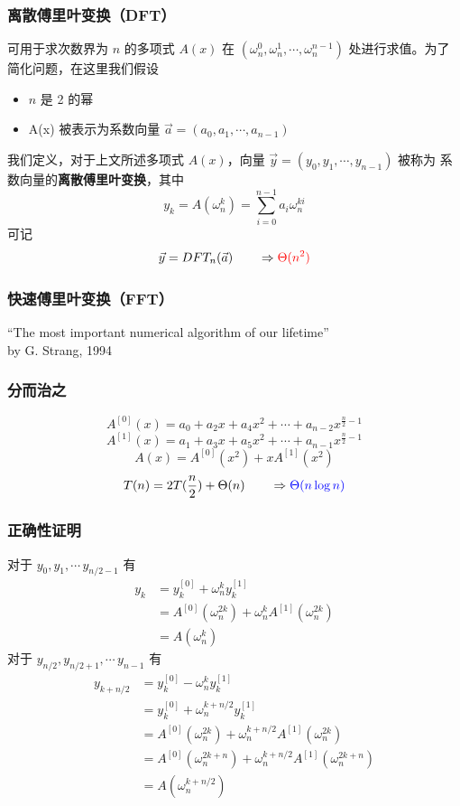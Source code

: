 \documentclass[UTF8]{ctexbeamer}
\begin{document}
\begin{frame}
    \frametitle{离散傅里叶变换（DFT）}
    可用于求次数界为 $n$ 的多项式 $A(x)$ 在
    $(\omega_n^{0}, \omega_n^{1}, \cdots, \omega_n^{n - 1})$
    处进行求值。为了简化问题，在这里我们假设
    \begin{itemize}
        \item $n$ 是 2 的幂
        \item A(x) 被表示为系数向量 $\vec{a} = (a_0, a_1, \cdots, a_{n-1})$
    \end{itemize}
    我们定义，对于上文所述多项式 $A(x)$，向量 $\vec{y} = (y_0, y_1, \cdots, y_{n-1})$ 被称为
    系数向量的\textbf{离散傅里叶变换}，其中
    $$y_k = A(\omega_n^k) = \sum_{i = 0}^{n-1} a_i \omega_n^{ki}$$
    可记
    $$\vec{y} = DFT_n(\vec{a}) \qquad \Rightarrow \textcolor{red}{\Theta(n^2)}$$
\end{frame}

\begin{frame}
    \frametitle{快速傅里叶变换（FFT）}
    \centering ``The most important numerical algorithm of our lifetime'' \\ by G. Strang, 1994
\end{frame}

\begin{frame}
    \frametitle{分而治之}
    $$A^{[0]}(x) = a_0 + a_2 x + a_4 x^2 + \cdots + a_{n-2} x^{\frac{n}{2} - 1}$$
    $$A^{[1]}(x) = a_1 + a_3 x + a_5 x^2 + \cdots + a_{n-1} x^{\frac{n}{2} - 1}$$
    $$A(x) = A^{[0]}(x^2) + xA^{[1]}(x^2)$$
    $$T(n) = 2T(\frac{n}{2}) + \Theta(n) \qquad \Rightarrow \textcolor{blue}{\Theta(n \log n)}$$
\end{frame}

\begin{frame}
    \frametitle{正确性证明}
    对于 $y_0, y_1, \cdots\, y_{n/2 - 1}$ 有
    \begin{displaymath} 
        \begin{aligned}	 
         y_k & = y_k^{[0]} + \omega_n^k y_k^{[1]} \\
         & = A^{[0]}(\omega_n^{2k}) + \omega_n^k A^{[1]}(\omega_n^{2k}) \\
         & = A(\omega_n^k)
         \end{aligned}
    \end{displaymath}
    对于 $y_{n/2}, y_{n/2 + 1}, \cdots\, y_{n - 1}$ 有
    \begin{displaymath} 
        \begin{aligned}	 
         y_{k + n/2} & = y_k^{[0]} - \omega_n^k y_k^{[1]} \\
         & = y_k^{[0]} + \omega_n^{k + n/2} y_k^{[1]} \\
         & = A^{[0]}(\omega_n^{2k}) + \omega_n^{k + n/2} A^{[1]}(\omega_n^{2k}) \\
         & = A^{[0]}(\omega_n^{2k + n}) + \omega_n^{k + n/2} A^{[1]}(\omega_n^{2k + n}) \\
         & = A(\omega_n^{k + n/2})
         \end{aligned}
    \end{displaymath}
\end{frame}
\end{document}
